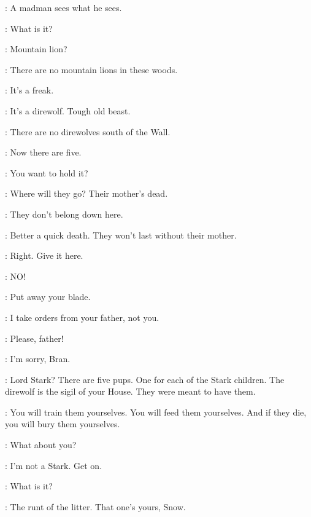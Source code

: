 \NED: A madman sees what he sees. 


\JON: What is it? 

\THEON: Mountain lion? 

\NED: There are no mountain lions in these woods. 


\THEON: It's a freak. 

\NED: It's a direwolf. Tough old beast. 

\ROBB: There are no direwolves south of the Wall. 

\JON: Now there are five. 


\JON: You want to hold it? 

\BRAN: Where will they go? Their mother's dead. 

\RODRIK: They don't belong down here. 

\NED: Better a quick death. They won't last without their mother. 

\THEON: Right. Give it here. 

\BRAN: NO! 

\ROBB: Put away your blade. 

\THEON: I take orders from your father, not you. 

\BRAN: Please, father! 

\NED: I'm sorry, Bran. 

\JON: Lord Stark? There are five pups. One for each of the Stark children. The direwolf is the sigil of your House. They were meant to have them. 

\NED: You will train them yourselves. You will feed them yourselves. And if they die, you will bury them yourselves. 


\BRAN: What about you? 

\JON: I'm not a Stark. Get on. 


\ROBB: What is it? 


\THEON: The runt of the litter. That one's yours, Snow. 


